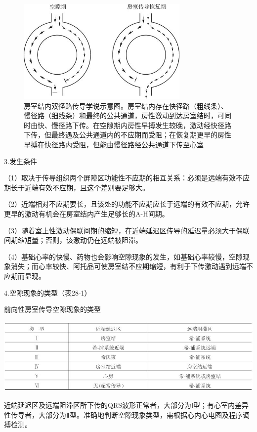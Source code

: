 \begin{figure}[!htbp]
 \centering
 \includegraphics[width=3.28125in,height=2in]{./images/Image00469.jpg}
 \captionsetup{justification=centering}
 \caption{房室结内双径路传导学说示意图。房室结内存在快径路（粗线条）、慢径路（细线条）和最终的公共通道，房性激动到达房室结时，可同时由快、慢径路下传。在空隙期内房性早搏发生较晚，激动经快径路下传，但最终遇及公共通道内的不应期而受阻；在恢复期更早的房性早搏在快径路内受阻，但能由慢径路经公共通道下传至心室}
 \label{fig28-9}
  \end{figure} 

3.发生条件

（1）取决于传导组织两个屏障区功能性不应期的相互关系：必须是远端有效不应期长于近端有效不应期，且这个差别要足够大。

（2）近端相对不应期要长，且该处的功能不应期应长于远端的有效不应期，允许更早的激动有机会在房室结内产生足够长的A-H间期。

（3）随着室上性激动偶联间期的缩短，在近端延迟区传导的延迟量必须大于偶联间期缩短量；否则，该激动仍在远端被阻滞。

（4）基础心率的快慢、药物也会影响空隙现象的发生，如基础心率较慢，空隙现象消失；而心率较快、阿托品可使房室结不应期缩短，有利于下传激动遇到远端不应期而显现。

4.空隙现象的类型（表28-1）

\begin{table}[htbp]
\centering
\caption{前向性房室传导空隙现象的类型}
\label{tab28-1}
\includegraphics[width=5.44792in,height=1.47917in]{./images/Image00470.jpg}
\end{table}

近端延迟区及远端阻滞区所下传的QRS波形正常者，大部分为Ⅰ型；有心室内差异性传导者，大部分为Ⅱ型。准确地判断空隙现象类型，需根据心内心电图及程序调搏检测。

